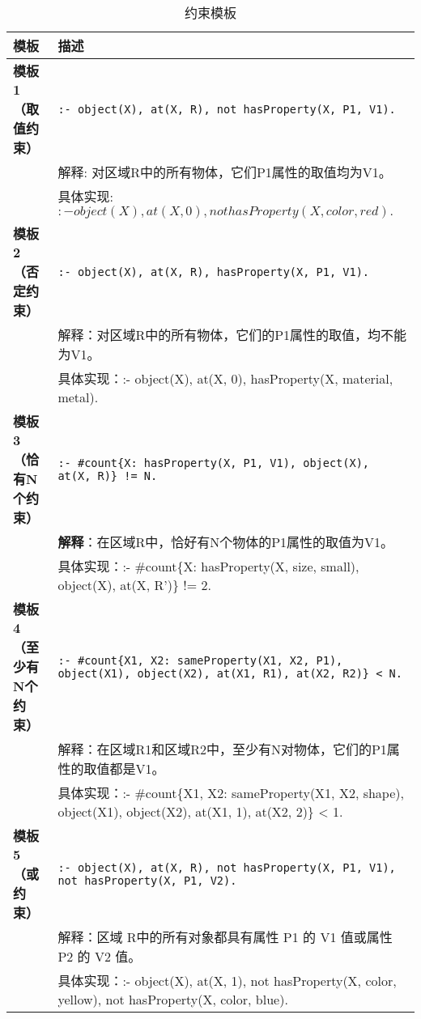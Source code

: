 \begin{table}[h]
    \centering
    \renewcommand{\arraystretch}{1.2}
    \begin{tabular}{|p{3cm}|p{12cm}|}
        \hline
        \textbf{模板} & \textbf{描述} \\
        \hline
        \textbf{模板1（取值约束）} & 
        \texttt{:- object(X), at(X, R), not hasProperty(X, P1, V1).} \\ 
        & 解释: 对区域R中的所有物体，它们P1属性的取值均为V1。 \\ 
        & 具体实现: $:- object(X), at(X, 0), not hasProperty(X, color, red).$ \\
        \hline
        
        \textbf{模板2（否定约束）} & 
        \texttt{:- object(X), at(X, R), hasProperty(X, P1, V1).} \\ 
        & 解释：对区域R中的所有物体，它们的P1属性的取值，均不能为V1。 \\ 
        & 具体实现：:- object(X), at(X, 0), hasProperty(X, material, metal). \\
        \hline
        
        \textbf{模板3（恰有N个约束）} & 
        \texttt{:- \#count\{X: hasProperty(X, P1, V1), object(X), at(X, R)\} != N.} \\ 
        & \textbf{解释}：在区域R中，恰好有N个物体的P1属性的取值为V1。 \\ 
        & 具体实现：:- \#count\{X: hasProperty(X, size, small), object(X), at(X, R')\} != 2. \\
        \hline
        
        \textbf{模板4（至少有N个约束）} & 
        \texttt{:- \#count\{X1, X2: sameProperty(X1, X2, P1), object(X1), object(X2), at(X1, R1), at(X2, R2)\} < N.} \\ 
        & 解释：在区域R1和区域R2中，至少有N对物体，它们的P1属性的取值都是V1。 \\ 
        & 具体实现：:- \#count\{X1, X2: sameProperty(X1, X2, shape), object(X1), object(X2), at(X1, 1), at(X2, 2)\} < 1. \\
        \hline
        
        \textbf{模板5（或约束）} & 
        \texttt{:- object(X), at(X, R), not hasProperty(X, P1, V1), not hasProperty(X, P1, V2).} \\ 
        & 解释：区域 R中的所有对象都具有属性 P1 的 V1 值或属性 P2 的 V2 值。 \\ 
        & 具体实现：:- object(X), at(X, 1), not hasProperty(X, color, yellow), not hasProperty(X, color, blue). \\
        \hline
    \end{tabular}
    \caption{约束模板}
    \label{tab:asp_templates}
\end{table}

